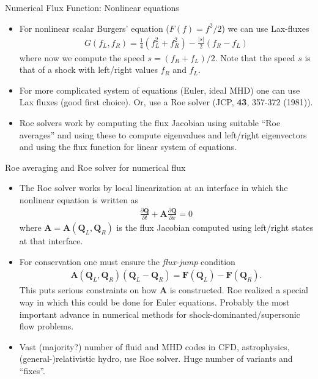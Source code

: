 \documentclass[aspectratio=169]{beamer}
\newcommand{\mypause}{\pause}
\newcommand{\pfrac}[2]{\frac{\partial #1}{\partial #2}}
\newcommand{\mvec}[1]{\mathbf{#1}}
\begin{document}
\begin{frame}{Numerical Flux Function: Nonlinear equations}
  \begin{itemize}
  \item For nonlinear scalar Burgers' equation ($F(f) = f^2/2$) we can
    use Lax-fluxes
    \begin{align*}
      G(f_L,f_R) = \frac{1}{4} ( f_L^2 + f_R^2 ) - \frac{|s|}{2}( f_R - f_L )
    \end{align*}
    where now we compute the speed $s = (f_R+f_L)/2$. Note that the
    speed $s$ is that of a shock with left/right values $f_R$ and
    $f_L$.%
    \mypause%
  \item For more complicated system of equations (Euler, ideal MHD)
    one can use Lax fluxes (good first choice). Or, use a Roe solver
    (JCP, {\bf 43}, 357-372 (1981)).%
    \mypause%
  \item Roe solvers work by computing the flux Jacobian using suitable
    ``Roe averages'' and using these to compute eigenvalues and
    left/right eigenvectors and using the flux function for linear
    system of equations.
  \end{itemize}

\end{frame}

\begin{frame}{Roe averaging and Roe solver for numerical flux}
  \small%
  \begin{itemize}
  \item The Roe solver works by local linearization at an interface in
    which the nonlinear equation is written as
    \begin{align*}
      \pfrac{\mvec{Q}}{t} + \mvec{A}\pfrac{\mvec{Q}}{x} = 0
    \end{align*}
    where $\mvec{A} = \mvec{A}(\mvec{Q}_L,\mvec{Q}_R)$ is the flux
    Jacobian computed using left/right states at that interface.%
    \mypause
  \item For conservation one must ensure the \emph{flux-jump}
    condition
    \begin{align*}
      \mvec{A}(\mvec{Q}_L,\mvec{Q}_R)(\mvec{Q}_L-\mvec{Q}_R)
      =
      \mvec{F}(\mvec{Q}_L)-\mvec{F}(\mvec{Q}_R).
    \end{align*}
    This puts serious constraints on how $\mvec{A}$ is
    constructed. Roe realized a special way in which this could be
    done for Euler equations. Probably the most important advance in
    numerical methods for shock-dominanted/supersonic flow problems.%
    \mypause%
  \item Vast (majority?) number of fluid and MHD codes in CFD,
    astrophysics, (general-)relativistic hydro, use Roe solver. Huge
    number of variants and ``fixes''.
  \end{itemize}
\end{frame}
\end{document}
